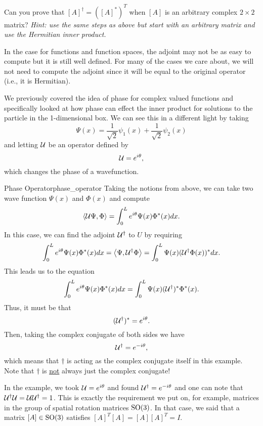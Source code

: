 \begin{exercise}
	Can you prove that $[A]^\dagger=\left([A]^*\right)^T$ when $[A]$ is an arbitrary complex $2\times 2$ matrix? \emph{Hint: use the same steps as above but start with an arbitrary matrix and use the Hermitian inner product.}
\end{exercise}

In the case for functions and function spaces, the adjoint may not be as easy to compute but it is still well defined.  For many of the cases we care about, we will not need to compute the adjoint since it will be equal to the original operator (i.e., it is Hermitian).  

We previously covered the idea of phase for complex valued functions and specifically looked at how phase can effect the inner product for solutions to the particle in the 1-dimensional box.  We can see this in a different light by taking
\[
\Psi(x) = \frac{1}{\sqrt{2}} \psi_1(x) + \frac{1}{\sqrt{2}} \psi_2(x)
\]
and letting $\mathcal{U}$ be an operator defined by
\[
\mathcal{U} = e^{i \theta},
\]
which changes the phase of a wavefunction.  

\begin{ex}{Phase Operator}{phase_operator}
	Taking the notions from above, we can take two wave function $\Psi(x)$ and $\Phi(x)$ and compute
	\[
	\left\langle \mathcal{U}\Psi, \Phi \right\rangle = \int_0^L e^{i\theta} \Psi(x) \Phi^*(x)dx.
	\]
	In this case, we can find the adjoint $\mathcal{U}^\dagger$ to $U$ by requiring
	\[
	\int_0^L e^{i\theta}\Psi(x)\Phi^*(x)dx = \left\langle \Psi, \mathcal{U}^\dagger \Phi \right\rangle = \int_0^L \Psi(x) (\mathcal{U}^\dagger \Phi(x))^*dx.
	\]
	This leads us to the equation
	\[
	\int_0^L e^{i\theta} \Psi(x) \Phi^*(x)dx = \int_0^L \Psi(x) (\mathcal{U}^\dagger)^* \Phi^*(x).
	\]
	Thus, it must be that 
	\[
	(\mathcal{U}^\dagger)^* = e^{i\theta}.
	\]
	Then, taking the complex conjugate of both sides we have
	\[
	\mathcal{U}^\dagger = e^{-i\theta},
	\]
	which means that $\dagger$ is acting as the complex conjugate itself in this example.
Note that $\dagger$ is \underline{not} always just the complex conjugate! 
\end{ex}

In the example, we took $\mathcal{U}=e^{i\theta}$ and found $\mathcal{U}^\dagger = e^{-i\theta}$ and one can note that $\mathcal{U}^\dagger \mathcal{U} = \mathcal{U} \mathcal{U}^\dagger =1$. This is exactly the requirement we put on, for example, matrices in the group of spatial rotation matrices $\mathrm{SO}(3)$. In that case, we said that a matrix $[A]\in \mathrm{SO}(3)$ satisfies $[A]^T [A]=[A][A]^T = I$.  

